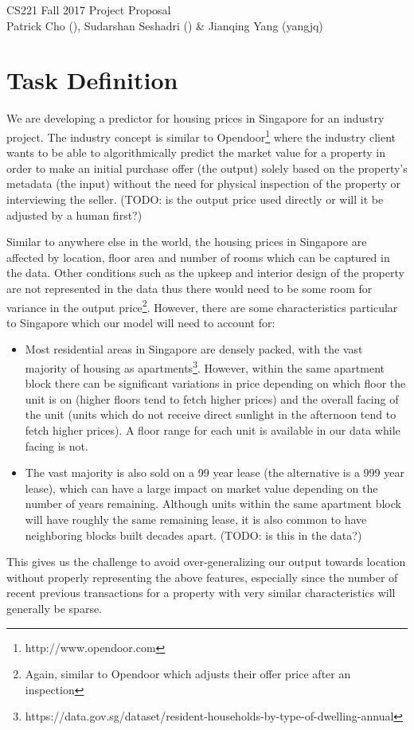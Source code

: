 \documentclass[12pt]{article}
\begin{document}
\begin{center}
{\Large CS221 Fall 2017 Project Proposal}\\
Patrick Cho (), Sudarshan Seshadri () \& Jianqing Yang (yangjq)
\end{center}

\section*{Task Definition}

We are developing a predictor for housing prices in Singapore for an industry project. The industry concept is similar to Opendoor\footnote{http://www.opendoor.com} where the industry client wants to be able to algorithmically predict the market value for a property in order to make an initial purchase offer (the output) solely based on the property's metadata (the input) without the need for physical inspection of the property or interviewing the seller. (TODO: is the output price used directly or will it be adjusted by a human first?)

Similar to anywhere else in the world, the housing prices in Singapore are affected by location, floor area and number of rooms which can be captured in the data. Other conditions such as the upkeep and interior design of the property are not represented in the data thus there would need to be some room for variance in the output price\footnote{Again, similar to Opendoor which adjusts their offer price after an inspection}. However, there are some characteristics particular to Singapore which our model will need to account for:
\begin{itemize}
\item Most residential areas in Singapore are densely packed, with the vast majority of housing as apartments\footnote{https://data.gov.sg/dataset/resident-households-by-type-of-dwelling-annual}. However, within the same apartment block there can be significant variations in price depending on which floor the unit is on (higher floors tend to fetch higher prices) and the overall facing of the unit (units which do not receive direct sunlight in the afternoon tend to fetch higher prices). A floor range for each unit is available in our data while facing is not.
\item The vast majority is also sold on a 99 year lease (the alternative is a 999 year lease), which can have a large impact on market value depending on the number of years remaining. Although units within the same apartment block will have roughly the same remaining lease, it is also common to have neighboring blocks built decades apart. (TODO: is this in the data?)
\end{itemize}
This gives us the challenge to avoid over-generalizing our output towards location without properly representing the above features, especially since the number of recent previous transactions for a property with very similar characteristics will generally be sparse.
\end{document}
